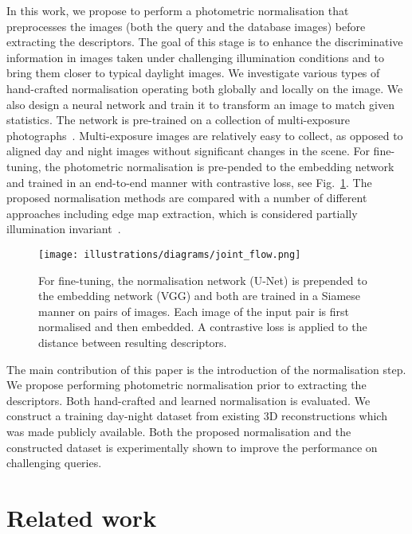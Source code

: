 In this work, we propose to perform a photometric normalisation that preprocesses the images (both the query and the database images) before extracting the descriptors.
The goal of this stage is to enhance the discriminative information in images taken under challenging illumination conditions and to bring them closer to typical daylight images. 
We investigate various types of hand-crafted normalisation operating both globally and locally on the image. 
We also design a neural network and train it to transform an image to match given statistics. The network is pre-trained on a collection of multi-exposure photographs~\cite{Chen-CVPR18}. Multi-exposure images are relatively easy to collect, as opposed to aligned day and night images without significant changes in the scene. For fine-tuning, the photometric normalisation is pre-pended to the embedding network and trained in an end-to-end manner with contrastive loss, see Fig.~\ref{fig:finetune}.
The proposed normalisation methods are compared with a number of different approaches including edge map extraction, which is considered partially illumination invariant~\cite{Radenovic-ECCV18}.

\begin{figure}[t] \centering
    \texttt{[image: illustrations/diagrams/joint\_flow.png]}\\[3pt]

    \caption{For fine-tuning, the normalisation network (U-Net) is prepended to the embedding network (VGG) and both are trained in a Siamese manner on pairs of images. Each image of the input pair is first normalised and then embedded. A contrastive loss is applied to the distance between resulting descriptors.}
\label{fig:finetune}
\end{figure}
 
The main contribution of this paper is the introduction of the normalisation step. We propose performing photometric normalisation prior to extracting the descriptors. Both hand-crafted and learned normalisation is evaluated. We construct a training day-night dataset from existing 3D reconstructions which was made publicly available. Both the proposed normalisation and the constructed dataset is experimentally shown to improve the performance on challenging queries.


\section{Related work}

